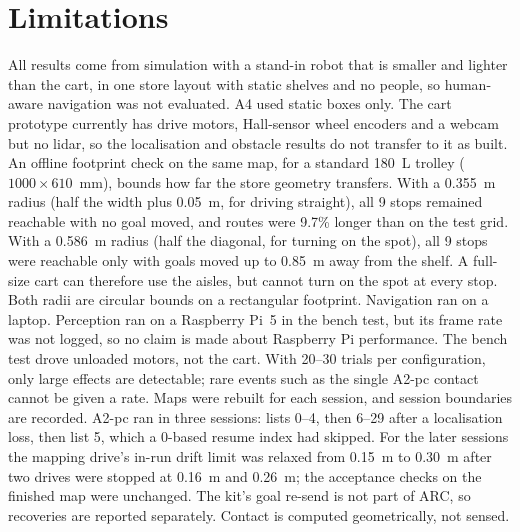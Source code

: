 \documentclass[conference]{IEEEtran}
\begin{document}
\section{Limitations}
All results come from simulation with a stand-in robot that is smaller and lighter than the cart, in one store layout with static shelves and no people, so human-aware navigation \cite{kruse2013,moller2021} was not evaluated. A4 used static boxes only. The cart prototype currently has drive motors, Hall-sensor wheel encoders and a webcam but no lidar, so the localisation and obstacle results do not transfer to it as built. An offline footprint check on the same map, for a standard 180~L trolley ($1000\times610$~mm), bounds how far the store geometry transfers. With a 0.355~m radius (half the width plus 0.05~m, for driving straight), all 9 stops remained reachable with no goal moved, and routes were 9.7\% longer than on the test grid. With a 0.586~m radius (half the diagonal, for turning on the spot), all 9 stops were reachable only with goals moved up to 0.85~m away from the shelf. A full-size cart can therefore use the aisles, but cannot turn on the spot at every stop. Both radii are circular bounds on a rectangular footprint. Navigation ran on a laptop. Perception ran on a Raspberry Pi~5 in the bench test, but its frame rate was not logged, so no claim is made about Raspberry Pi performance. The bench test drove unloaded motors, not the cart. With 20--30 trials per configuration, only large effects are detectable; rare events such as the single A2-pc contact cannot be given a rate. Maps were rebuilt for each session, and session boundaries are recorded. A2-pc ran in three sessions: lists 0--4, then 6--29 after a localisation loss, then list 5, which a 0-based resume index had skipped. For the later sessions the mapping drive's in-run drift limit was relaxed from 0.15~m to 0.30~m after two drives were stopped at 0.16~m and 0.26~m; the acceptance checks on the finished map were unchanged. The kit's goal re-send is not part of ARC, so recoveries are reported separately. Contact is computed geometrically, not sensed.
\end{document}
